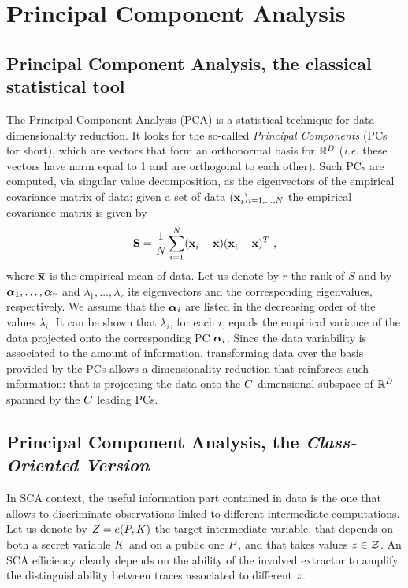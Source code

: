\section{Principal Component Analysis}\label{sec:PCA}
%
%
\subsection{Principal Component Analysis, the classical statistical tool}
The Principal Component Analysis (PCA) \cite{fisher1938statistical} is a statistical technique for data dimensionality reduction. It looks for the so-called {\em Principal Components} (PCs for short), which are vectors that form an orthonormal basis for $\mathbb{R}^\traceLength$ (\textit{i.e.} these vectors have norm equal to 1 and are orthogonal to each other). Such PCs are computed, via singular value decomposition, as the eigenvectors of the empirical covariance matrix of data: given a set of data $(\sss[]{i})_{i=1,\dots,\numTraces[]}$ the empirical covariance matrix is given by
\begin{equation}\label{eq:covmat}
\covmat = \frac{1}{\numTraces[]} \sum_{i=1}^{\numTraces[]}(\sss[]{i} - \mmmX)(\sss[]{i} - \mmmX)^T \mbox{ ,}
\end{equation}
 where $\mmmX$ is the empirical mean of data. Let us denote by $r$ the rank of $S$ and by $\AAlpha_1, \dots, \AAlpha_r$ and $\lambda_1, \dots, \lambda_r$ its eigenvectors and the corresponding eigenvalues, respectively. We assume that the $\AAlpha_i$ are listed in the decreasing order of the values $\lambda_i$. It can be shown that $\lambda_i$, for each $i$, equals the empirical variance of the data projected onto the corresponding PC $\AAlpha_i$. Since the data variability is associated to the amount of information, transforming data over the basis provided by the PCs allows a dimensionality reduction that reinforces such information: that is projecting the data onto the  $\newTraceLength$-dimensional subspace of $\mathbb{R}^\traceLength$ spanned by the $\newTraceLength$ leading PCs.\\

\subsection{Principal Component Analysis, the {\em Class-Oriented Version}}\label{sec:PCA_classes}
In SCA context, the useful information part contained in data is the one that allows to discriminate observations linked to different intermediate computations. Let us denote by $\sensRandVar = \targetFunction(\randPlaintext,\randKey)$ the target intermediate variable, that depends on both a secret variable $\randKey$ and on a public one $\randPlaintext$, and that takes values $\sensVar \in \sensVarSet$. An SCA efficiency clearly depends on the ability of the involved extractor to amplify the distinguishability between traces associated to different $\sensVar$.\\

